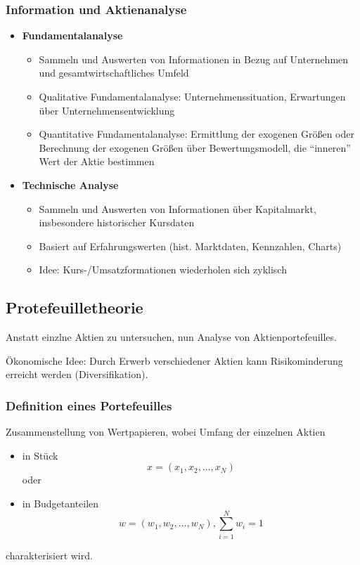 \subsubsection{Information und Aktienanalyse}
\begin{itemize}
	\item \textbf{Fundamentalanalyse}
	\begin{itemize}
		\item Sammeln und Auswerten von Informationen in Bezug auf Unternehmen und gesamtwirtschaftliches Umfeld
		\item Qualitative Fundamentalanalyse: Unternehmenssituation, Erwartungen über Unternehmensentwicklung
		\item Quantitative Fundamentalanalyse: Ermittlung der exogenen Größen oder Berechnung der exogenen Größen über Bewertungsmodell, die "`inneren"' Wert der Aktie bestimmen
	\end{itemize}
	\item \textbf{Technische Analyse}
	\begin{itemize}
		\item Sammeln und Auswerten von Informationen über Kapitalmarkt, insbesondere historischer Kursdaten
		\item Basiert auf Erfahrungswerten (hist. Marktdaten, Kennzahlen, Charts)
		\item Idee: Kurs-/Umsatzformationen wiederholen sich zyklisch
	\end{itemize}
\end{itemize}


\subsection{Protefeuilletheorie}
Anstatt einzlne Aktien zu untersuchen, nun Analyse von Aktienportefeuilles.

Ökonomische Idee: Durch Erwerb verschiedener Aktien kann Risikominderung erreicht werden (Diversifikation).

\subsubsection{Definition eines Portefeuilles}
Zusammenstellung von Wertpapieren, wobei Umfang der einzelnen Aktien
\begin{itemize}
	\item in Stück \[x = (x_1, x_2, \dots , x_N)\] oder
	\item in Budgetanteilen \[w = (w_1, w_2, \dots , w_N), \sum_{i=1}^{N} w_i = 1\]
\end{itemize}
charakterisiert wird.

